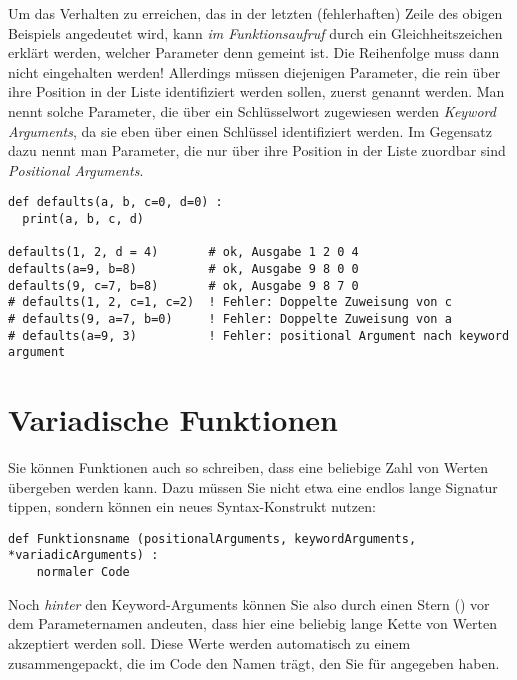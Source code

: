 Um das Verhalten zu erreichen, das in der letzten (fehlerhaften) Zeile des obigen Beispiels angedeutet wird, kann \emph{im Funktionsaufruf} durch ein Gleichheitszeichen erklärt werden, welcher Parameter denn gemeint ist. Die Reihenfolge muss dann nicht eingehalten werden! Allerdings müssen diejenigen Parameter, die rein über ihre Position in der Liste identifiziert werden sollen, zuerst genannt werden. Man nennt solche Parameter, die über ein Schlüsselwort zugewiesen werden \emph{Keyword Arguments}, da sie eben über einen Schlüssel identifiziert werden. Im Gegensatz dazu nennt man Parameter, die nur über ihre Position in der Liste zuordbar sind \emph{Positional Arguments}.

\begin{codebox}
\begin{verbatim}
def defaults(a, b, c=0, d=0) :
  print(a, b, c, d)
  
defaults(1, 2, d = 4)       # ok, Ausgabe 1 2 0 4
defaults(a=9, b=8)          # ok, Ausgabe 9 8 0 0
defaults(9, c=7, b=8)       # ok, Ausgabe 9 8 7 0
# defaults(1, 2, c=1, c=2)  ! Fehler: Doppelte Zuweisung von c
# defaults(9, a=7, b=0)     ! Fehler: Doppelte Zuweisung von a
# defaults(a=9, 3)          ! Fehler: positional Argument nach keyword argument
\end{verbatim}
\end{codebox}


\section{Variadische Funktionen}
Sie können Funktionen auch so schreiben, dass eine beliebige Zahl von Werten übergeben werden kann. Dazu müssen Sie nicht etwa eine endlos lange Signatur tippen, sondern können ein neues Syntax-Konstrukt nutzen:

\begin{codebox}
\begin{verbatim}
def Funktionsname (positionalArguments, keywordArguments, *variadicArguments) :
    normaler Code
\end{verbatim}
\end{codebox}

Noch \emph{hinter} den Keyword-Arguments können Sie also durch einen Stern (\inPy{*}) vor dem Parameternamen andeuten, dass hier eine beliebig lange Kette von Werten akzeptiert werden soll. Diese Werte werden automatisch zu einem  zusammengepackt, die im Code den Namen trägt, den Sie für  angegeben haben.

